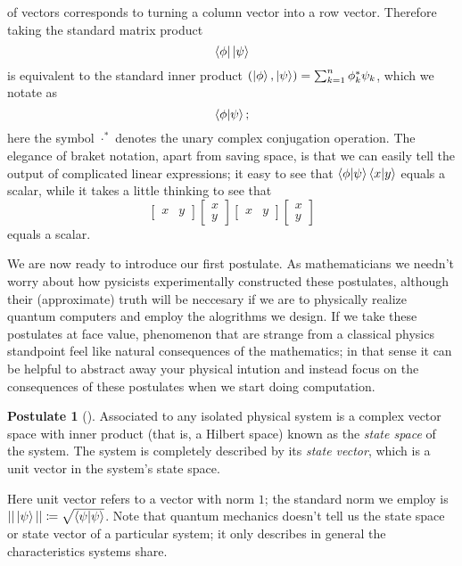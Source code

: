 \documentclass[12pt,twoside]{reedthesis}
\theoremstyle{plain}   %
\theoremstyle{definition}
\newtheorem{post}{Postulate}[section]
\theoremstyle{remark}
\numberwithin{equation}{section}
\begin{document}
  of vectors corresponds to turning a column vector into a row vector. Therefore taking the standard matrix product
  \[\bra{\phi} \ket{\psi}\]
  is equivalent to the standard inner product $(\ket{\phi}, \ket{\psi}) = \sum_{k=1}^n \phi_k^* \psi_k$, which we notate as
  \[\braket{\phi | \psi};\]
  here the symbol $\cdot^*$ denotes the unary complex conjugation operation.
  The elegance of braket notation, apart from saving space, is that we can easily tell the output of complicated linear expressions;
  it easy to see that $\braket{\phi | \psi} \braket{x | y}$ equals a scalar, while it takes a little thinking to see that
  \[
    \begin{bmatrix}
      x & y
    \end{bmatrix}
    \begin{bmatrix}
      x \\ y
    \end{bmatrix}
    \begin{bmatrix}
      x & y
    \end{bmatrix}
    \begin{bmatrix}
      x \\ y
    \end{bmatrix}
  \]
  equals a scalar.
  \par
  We are now ready to introduce our first postulate. As mathematicians we needn't worry about how pysicists experimentally constructed these postulates, although their
  (approximate) truth will be neccesary if we are to physically realize quantum computers and employ the alogrithms we design.
  If we take these postulates at face value, phenomenon that are strange from a classical physics standpoint feel like natural consequences of the mathematics;
  in that sense it can be helpful to abstract away your physical intution and instead focus on the consequences of these postulates when we start doing computation.
  \begin{post}[{\cite[2.2.1]{nielsen2010}}]
    Associated to any isolated physical system is a complex vector space
    with inner product (that is, a Hilbert space) known as the \emph{state space} of the
    system. The system is completely described by its \emph{state vector}, which is a unit
    vector in the system's state space.
  \end{post}
  Here unit vector refers to a vector with norm $1$; the standard norm we employ is $|| \ket{\psi} || \coloneq \sqrt{\braket{\psi| \psi}}$.
  Note that quantum mechanics doesn't tell us the state space or state vector of a particular system; it only describes in general the characteristics systems share.
\end{document}
